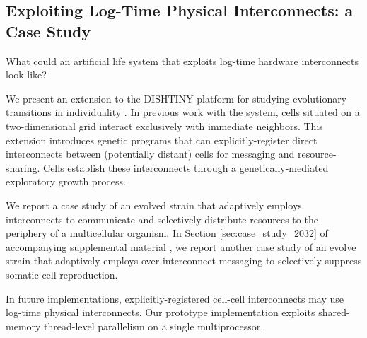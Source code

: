 

\subsection{Exploiting Log-Time Physical Interconnects: a Case Study}

What could an artificial life system that exploits log-time hardware interconnects look like?

We present an extension to 
the DISHTINY platform for studying evolutionary transitions in individuality \citep{moreno2019toward}.
In previous work with the system, cells situated on a two-dimensional grid interact exclusively with immediate neighbors.
This extension introduces 
genetic programs that can 
explicitly-register direct interconnects between (potentially distant) cells for messaging and resource-sharing.
Cells %
establish these interconnects through a genetically-mediated exploratory growth process.

We report a case study of an evolved strain that adaptively employs interconnects to communicate and selectively distribute resources to the periphery of a multicellular organism.
In Section \ref{sec:case_study_2032} of accompanying supplemental material \citep{Moreno_Ofria_2020}, we report another case study of an evolve strain that adaptively employs over-interconnect messaging to selectively suppress somatic cell reproduction.

In future implementations, explicitly-registered cell-cell interconnects may use log-time physical interconnects.
Our prototype implementation exploits shared-memory thread-level parallelism on a single multiprocessor.

